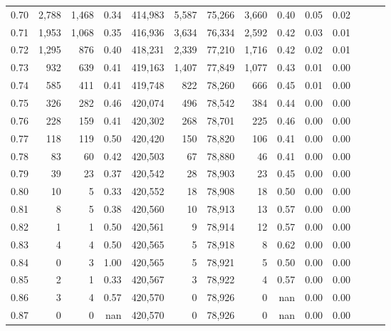 \begin{tabular}{rrrrrrrrrrrrrr}
0.70 &   2,788 &  1,468 &  0.34 &  414,983 &    5,587 &  75,266 &   3,660 &  0.40 &  0.05 &      0.02 \\
0.71 &   1,953 &  1,068 &  0.35 &  416,936 &    3,634 &  76,334 &   2,592 &  0.42 &  0.03 &      0.01 \\
0.72 &   1,295 &    876 &  0.40 &  418,231 &    2,339 &  77,210 &   1,716 &  0.42 &  0.02 &      0.01 \\
0.73 &     932 &    639 &  0.41 &  419,163 &    1,407 &  77,849 &   1,077 &  0.43 &  0.01 &      0.00 \\
0.74 &     585 &    411 &  0.41 &  419,748 &      822 &  78,260 &     666 &  0.45 &  0.01 &      0.00 \\
0.75 &     326 &    282 &  0.46 &  420,074 &      496 &  78,542 &     384 &  0.44 &  0.00 &      0.00 \\
0.76 &     228 &    159 &  0.41 &  420,302 &      268 &  78,701 &     225 &  0.46 &  0.00 &      0.00 \\
0.77 &     118 &    119 &  0.50 &  420,420 &      150 &  78,820 &     106 &  0.41 &  0.00 &      0.00 \\
0.78 &      83 &     60 &  0.42 &  420,503 &       67 &  78,880 &      46 &  0.41 &  0.00 &      0.00 \\
0.79 &      39 &     23 &  0.37 &  420,542 &       28 &  78,903 &      23 &  0.45 &  0.00 &      0.00 \\
0.80 &      10 &      5 &  0.33 &  420,552 &       18 &  78,908 &      18 &  0.50 &  0.00 &      0.00 \\
0.81 &       8 &      5 &  0.38 &  420,560 &       10 &  78,913 &      13 &  0.57 &  0.00 &      0.00 \\
0.82 &       1 &      1 &  0.50 &  420,561 &        9 &  78,914 &      12 &  0.57 &  0.00 &      0.00 \\
0.83 &       4 &      4 &  0.50 &  420,565 &        5 &  78,918 &       8 &  0.62 &  0.00 &      0.00 \\
0.84 &       0 &      3 &  1.00 &  420,565 &        5 &  78,921 &       5 &  0.50 &  0.00 &      0.00 \\
0.85 &       2 &      1 &  0.33 &  420,567 &        3 &  78,922 &       4 &  0.57 &  0.00 &      0.00 \\
0.86 &       3 &      4 &  0.57 &  420,570 &        0 &  78,926 &       0 &   nan &  0.00 &      0.00 \\
0.87 &       0 &      0 &   nan &  420,570 &        0 &  78,926 &       0 &   nan &  0.00 &      0.00 \\

\end{tabular}
